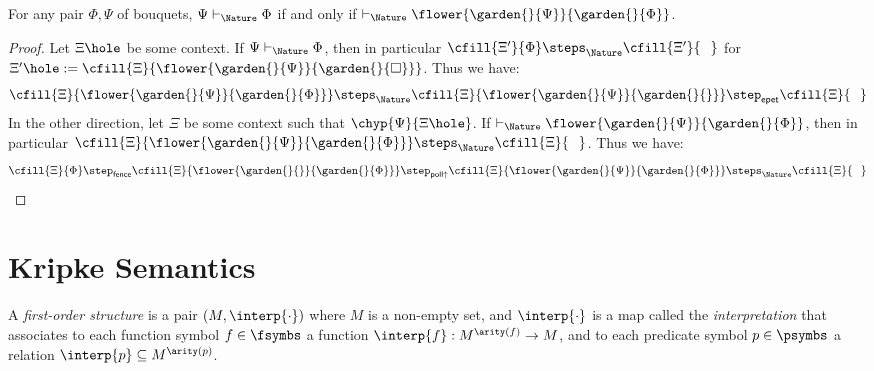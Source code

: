 \begin{theorem}[Deduction]
  For any pair $\Phi, \Psi$ of bouquets, $\Psi \vdash_{\Nature} \Phi$ if and only if
  $\vdash_{\Nature} \flower{\garden{{}}{\Psi}}{\garden{{}}{\Phi}}$.
\end{theorem}
\begin{proof}
  Let $\Xi\hole$ be some context. If $\Psi \vdash_{\Nature} \Phi$, then in particular
  $\cfill{\Xi'}{\Phi} \steps_{\Nature} \cfill{\Xi'}{\phantom{\Phi}}$ for $\Xi'\hole :=
  \cfill{\Xi}{\flower{\garden{{}}{\Psi}}{\garden{{}}{\square}}}$. Thus we have:
  $$
  \cfill{\Xi}{\flower{\garden{{}}{\Psi}}{\garden{{}}{\Phi}}} \steps_{\Nature}
  \cfill{\Xi}{\flower{\garden{{}}{\Psi}}{\garden{{}}{}}} \step_{\mathsf{epet}}
  \cfill{\Xi}{\phantom{\Phi}}
  $$
  In the other direction, let $\Xi$ be some context such that
  $\chyp{\Psi}{\Xi\hole}$. If $\vdash_{\Nature}
  \flower{\garden{{}}{\Psi}}{\garden{{}}{\Phi}}$, then in particular
  $\cfill{\Xi}{\flower{\garden{{}}{\Psi}}{\garden{{}}{\Phi}}} \steps_{\Nature}
  \cfill{\Xi}{\phantom{\Phi}}$. Thus we have:
  $$
  \cfill{\Xi}{\Phi} \step_{\mathsf{fence}}
  \cfill{\Xi}{\flower{\garden{{}}{{}}}{\garden{{}}{\Phi}}} \step_{\mathsf{poll{\uparrow}}}
  \cfill{\Xi}{\flower{\garden{{}}{\Psi}}{\garden{{}}{\Phi}}} \steps_{\Nature}
  \cfill{\Xi}{\phantom{\Phi}}
  $$
\end{proof}


\section{Kripke Semantics}


\begin{definition}
  A \emph{first-order structure} is a pair $( M, \interp{\cdot} )$
  where $M$ is a non-empty set, and $\interp{\cdot}$ is a map called the
  \emph{interpretation} that associates to each function symbol $f \in \fsymbs$
  a function $\interp{f} : M^{\arity(f)} \to M$, and to each predicate symbol $p
  \in \psymbs$ a relation $\interp{p} \subseteq M^{\arity(p)}$.
\end{definition}

